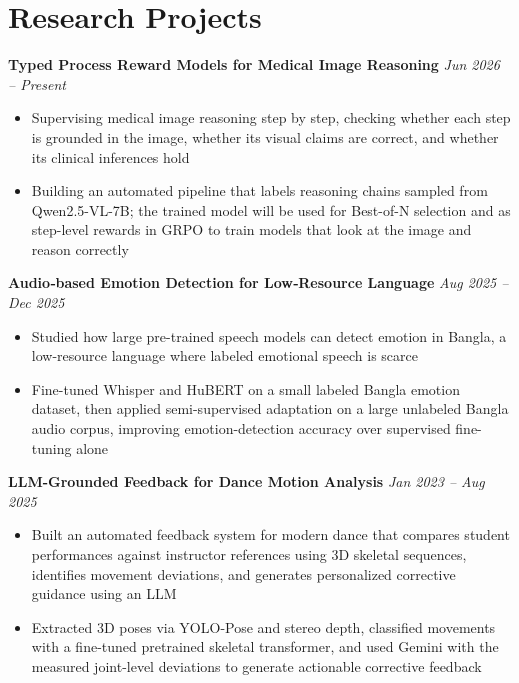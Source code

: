 \documentclass[10pt,letterpaper]{article}
\newcommand{\headingsimple}[2]{%
  \noindent\textbf{#1} \hfill #2\par
}
\begin{document}
\section{Research Projects}

\headingsimple{Typed Process Reward Models for Medical Image Reasoning}{\textit{Jun 2026 -- Present}}
\begin{itemize}
  \item Supervising medical image reasoning step by step, checking whether each step is grounded in the image, whether its visual claims are correct, and whether its clinical inferences hold
  \item Building an automated pipeline that labels reasoning chains sampled from Qwen2.5-VL-7B; the trained model will be used for Best-of-N selection and as step-level rewards in GRPO to train models that look at the image and reason correctly
\end{itemize}

\headingsimple{Audio‑based Emotion Detection for Low‑Resource Language}{\textit{Aug 2025 -- Dec 2025}}
\begin{itemize}
  \item Studied how large pre-trained speech models can detect emotion in Bangla, a low-resource language where labeled emotional speech is scarce
  \item Fine-tuned Whisper and HuBERT on a small labeled Bangla emotion dataset, then applied semi-supervised adaptation on a large unlabeled Bangla audio corpus, improving emotion-detection accuracy over supervised fine-tuning alone
\end{itemize}


\headingsimple{LLM-Grounded Feedback for Dance Motion Analysis}{\textit{Jan 2023 -- Aug 2025}}
\begin{itemize}
  \item Built an automated feedback system for modern dance that compares student performances against instructor references using 3D skeletal sequences, identifies movement deviations, and generates personalized corrective guidance using an LLM
  \item Extracted 3D poses via YOLO-Pose and stereo depth, classified movements with a fine-tuned pretrained skeletal transformer, and used Gemini with the measured joint-level deviations to generate actionable corrective feedback
\end{itemize}
\end{document}
